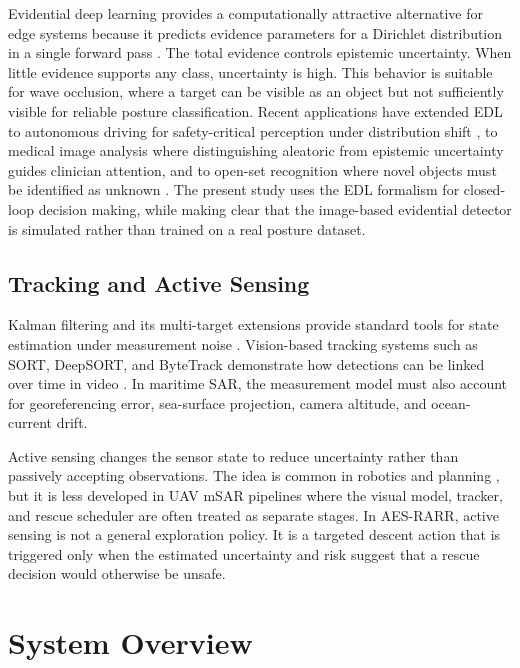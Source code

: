 \documentclass[runningheads]{llncs}
\newcommand{\aes}{AES-RARR}
\begin{document}
Evidential deep learning provides a computationally attractive alternative for edge systems because it predicts evidence parameters for a Dirichlet distribution in a single forward pass \cite{sensoy2018edl}. The total evidence controls epistemic uncertainty. When little evidence supports any class, uncertainty is high. This behavior is suitable for wave occlusion, where a target can be visible as an object but not sufficiently visible for reliable posture classification. Recent applications have extended EDL to autonomous driving for safety-critical perception under distribution shift \cite{amini2020deep}, to medical image analysis where distinguishing aleatoric from epistemic uncertainty guides clinician attention, and to open-set recognition where novel objects must be identified as unknown \cite{bao2021opset}. The present study uses the EDL formalism for closed-loop decision making, while making clear that the image-based evidential detector is simulated rather than trained on a real posture dataset.

\subsection{Tracking and Active Sensing}

Kalman filtering and its multi-target extensions provide standard tools for state estimation under measurement noise \cite{kalman1960filter,barshalom2001estimation,blackman1999design}. Vision-based tracking systems such as SORT, DeepSORT, and ByteTrack demonstrate how detections can be linked over time in video \cite{bewley2016sort,wojke2017deepsort,zhang2022bytetrack}. In maritime SAR, the measurement model must also account for georeferencing error, sea-surface projection, camera altitude, and ocean-current drift.

Active sensing changes the sensor state to reduce uncertainty rather than passively accepting observations. The idea is common in robotics and planning \cite{lavalle2006planning,thrun2005probabilistic}, but it is less developed in UAV mSAR pipelines where the visual model, tracker, and rescue scheduler are often treated as separate stages. In \aes, active sensing is not a general exploration policy. It is a targeted descent action that is triggered only when the estimated uncertainty and risk suggest that a rescue decision would otherwise be unsafe.

\section{System Overview}
\end{document}
